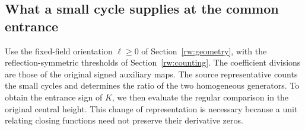 \subsection{What a small cycle supplies at the common entrance}

Use the fixed-field orientation $\ell\ge0$ of
Section~\ref{rw:geometry}, with the reflection-symmetric thresholds
of Section~\ref{rw:counting}. The coefficient divisions are those
of the original signed auxiliary maps.
The source representative counts the small cycles and determines the
ratio of the two homogeneous generators. To obtain the entrance sign
of $K$, we then evaluate the regular comparison in the original central
height. This change of representation is necessary because a unit
relating closing functions need not preserve their derivative zeros.

